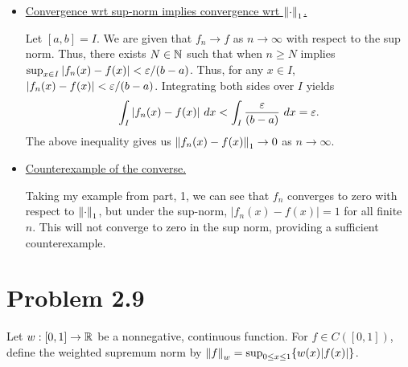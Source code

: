 \begin{solution}
\begin{itemize}[-]
        \clearpage
        \item \underline{Convergence wrt sup-norm implies convergence wrt $\norm{\cdot}_1$.}

        \jump
        Let $[a, b] = I$. We are given that $f_n \rightarrow f$ as $n \rightarrow \infty$ with respect to the sup norm. Thus, there exists $N \in \mathbb{N}$ such that when $n \geq N$ implies $\sup_{x \in I} |f_n(x) - f(x)| < \varepsilon / (b - a)$. Thus, for any $x \in I$, $|f_n(x) - f(x)| < \varepsilon / (b - a)$. Integrating both sides over $I$ yields
        \[\int_I |f_n(x) - f(x)| \ dx < \int_I \frac{\varepsilon}{(b - a)} \ dx = \varepsilon. \]
        The above inequality gives us $\norm{f_n(x) - f(x)}_1 \rightarrow 0$ as $n \rightarrow \infty$. 

        \item \underline{Counterexample of the converse.}
        
        Taking my example from part, 1, we can see that $f_n$ converges to zero with respect to $\norm{\cdot}_1$, but under the sup-norm, $|f_n(x) - f(x)| = 1$ for all finite $n$. This will not converge to zero in the sup norm, providing a sufficient counterexample.
    \end{itemize}
\end{solution}
\clearpage

\newpage
\section{Problem 2.9}
Let $w : [0, 1] \rightarrow \mathbb{R}$ be a nonnegative, continuous function. For $f \in C([0, 1])$, define the weighted supremum norm by $\norm{f}_w = \sup_{0 \leq x \leq 1} \{ w(x)|f(x)|\}$.
